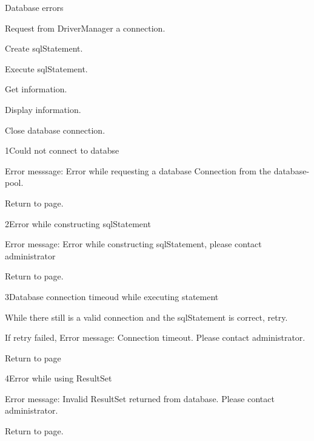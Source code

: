 \begin{uc}{Database errors}


    \begin{uc-mss}
    \item Request from DriverManager a connection.
    \item Create sqlStatement.
    \item Execute sqlStatement.
    \item Get information.
    \item Display information.
    \item Close database connection.
    \end{uc-mss}

    \begin{uc-ext}

        \begin{uc-fail}{1}{Could not connect to databse}
        \item Error messsage: Error while requesting a database Connection from the database-pool.
        \item Return to page.
        \end{uc-fail}

        \begin{uc-fail}{2}{Error while constructing sqlStatement}
        \item Error message: Error while constructing sqlStatement, please contact administrator
        \item Return to page.
        \end{uc-fail}

        \begin{uc-fail}{3}{Database connection timeoud while executing statement}
        \item While there still is a valid connection and the sqlStatement is correct, retry.
        \item If retry failed, Error message: Connection timeout. Please contact administrator.
        \item Return to page
        \end{uc-fail}

        \begin{uc-fail}{4}{Error while using ResultSet}
        \item Error message: Invalid ResultSet returned from database. Please contact administrator.
        \item Return to page.
        \end{uc-fail}



\end{uc-ext}
\end{uc}
